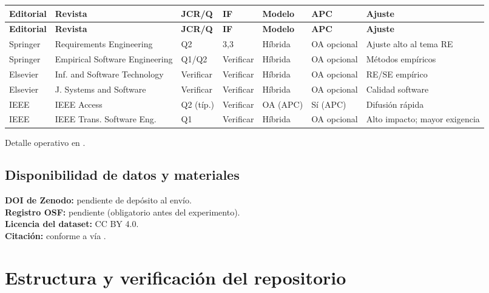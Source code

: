 \documentclass[12pt,journal,onecolumn]{IEEEtran}
\begin{document}
\small
\begin{longtable}{P{0.09\textwidth}P{0.22\textwidth}P{0.10\textwidth}P{0.07\textwidth}P{0.10\textwidth}P{0.10\textwidth}P{0.16\textwidth}}\toprule
\textbf{Editorial} & \textbf{Revista} & \textbf{JCR/Q} & \textbf{IF} & \textbf{Modelo} & \textbf{APC} & \textbf{Ajuste}\\\midrule\endfirsthead
\toprule\textbf{Editorial} & \textbf{Revista} & \textbf{JCR/Q} & \textbf{IF} & \textbf{Modelo} & \textbf{APC} & \textbf{Ajuste}\\\midrule\endhead
Springer & Requirements Engineering & Q2 & 3{,}3 & Híbrida & OA opcional & Ajuste alto al tema RE\\
Springer & Empirical Software Engineering & Q1/Q2 & Verificar & Híbrida & OA opcional & Métodos empíricos\\
Elsevier & Inf. and Software Technology & Verificar & Verificar & Híbrida & OA opcional & RE/SE empírico\\
Elsevier & J. Systems and Software & Verificar & Verificar & Híbrida & OA opcional & Calidad software\\
IEEE & IEEE Access & Q2 (típ.) & Verificar & OA (APC) & Sí (APC) & Difusión rápida\\
IEEE & IEEE Trans. Software Eng. & Q1 & Verificar & Híbrida & OA opcional & Alto impacto; mayor exigencia\\\bottomrule
\end{longtable}
\normalsize
Detalle operativo en .

\subsection{Disponibilidad de datos y materiales}
\textbf{DOI de Zenodo:} pendiente de depósito al envío.\\
\textbf{Registro OSF:} pendiente (obligatorio antes del experimento).\\
\textbf{Licencia del dataset:} CC BY 4.0.\\
\textbf{Citación:} conforme a \cite{smith2016software,druskat2021cff} vía .

\section{Estructura y verificación del repositorio}
\end{document}
